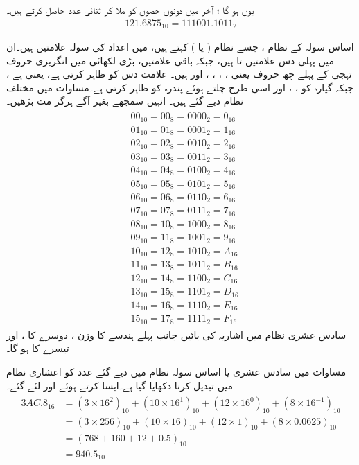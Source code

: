 یوں  ہو گا ؛ آخر میں دونوں حصوں کو ملا کر ثنائی عدد حاصل کرتے ہیں۔
\begin{align*}
121.6875_{10}=111001.1011_2
\end{align*}

	اساس سولہ کے نظام  ، جسے نظام (  یا  ) کہتے ہیں، میں اعداد کی سولہ علامتیں ہیں۔ان میں پہلی دس علامتیں  تا  ہیں، جبکہ باقی علامتیں، بڑی لکھائی میں انگریزی حروف تہجی کے پہلے چھ  حروف یعنی ، ، ، ،  اور  ہیں۔ علامت  دس  کو ظاہر کرتی ہے، یعنی  ہے ، جبکہ  گیارہ کو ، ، اور اسی طرح چلتے ہوئے  پندرہ کو ظاہر کرتی ہے۔مساوات  میں مختلف نظام دیے گئے ہیں۔ انہیں سمجھے بغیر آگے ہرگز مت بڑھیں۔ 
\begin{gather}
\begin{aligned}\label{مساوات_ثنائی_تمام}
&00_{10}=00_8=0000_2=0_{16}\\
&01_{10}=01_8=0001_2=1_{16}\\
&02_{10}=02_8=0010_2=2_{16}\\
&03_{10}=03_8=0011_2=3_{16}\\
&04_{10}=04_8=0100_2=4_{16}\\
&05_{10}=05_8=0101_2=5_{16}\\
&06_{10}=06_8=0110_2=6_{16}\\
&07_{10}=07_8=0111_2=7_{16}\\
&08_{10}=10_8=1000_2=8_{16}\\
&09_{10}=11_8=1001_2=9_{16}\\
&10_{10}=12_8=1010_2=A_{16}\\
&11_{10}=13_8=1011_2=B_{16}\\
&12_{10}=14_8=1100_2=C_{16}\\
&13_{10}=15_8=1101_2=D_{16}\\
&14_{10}=16_8=1110_2=E_{16}\\
&15_{10}=17_8=1111_2=F_{16}
\end{aligned}
\end{gather}
سادس عشری  نظام میں اشاریہ کی بائیں جانب پہلے ہندسے کا وزن ، دوسرے کا ، اور تیسرے کا  ہو گا۔ 

مساوات  میں سادس عشری یا اساس سولہ نظام میں دیے گئے عدد کو اعشاری نظام میں تبدیل کرنا دکھایا گیا ہے۔ایسا کرتے ہوئے  اور  لئے گئے۔
\begin{gather}
\begin{aligned}\label{مساوات_ثنائی_سادس}
3AC.8_{16}&=(3\times 16^2)_{10}+(10\times 16^1)_{10}+(12\times 16^0)_{10}+(8\times 16^{-1})_{10}\\
&=(3\times 256)_{10}+(10\times 16)_{10}+(12\times 1)_{10}+(8\times 0.0625)_{10}\\
&=(768+160+12+0.5)_{10}\\
&=940.5_{10}
\end{aligned}
\end{gather}

